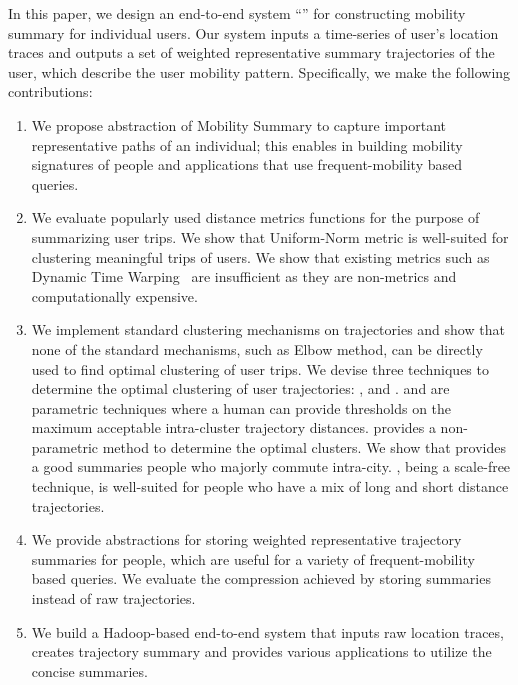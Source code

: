In this paper, we design an end-to-end system ``\trajSummary'' for constructing mobility summary for individual users. Our system inputs a time-series of user's location traces and outputs a set of weighted representative summary trajectories of the user, which describe the user mobility pattern. 
Specifically, we make the following contributions:
\begin{enumerate}[topsep=0pt,itemsep=-1ex,partopsep=1ex,parsep=1ex]
\item We propose abstraction of Mobility Summary to capture important representative paths of an individual; this enables in building mobility signatures of people and applications that use frequent-mobility based queries.
\item We evaluate popularly used distance metrics functions for the purpose of summarizing user trips. We show that Uniform-Norm metric is well-suited for clustering meaningful trips of users. We show that existing metrics such as Dynamic Time Warping~\cite{Yi1998} are insufficient as they are non-metrics and computationally expensive.
\item We implement standard clustering mechanisms on trajectories and show that none of the standard mechanisms, such as Elbow method, can be directly used to find optimal clustering of user trips. We devise three techniques to determine the optimal clustering of user trajectories: \thresh, \lthAware and \modal. \thresh and \lthAware are parametric techniques where a human can provide thresholds on the maximum acceptable intra-cluster trajectory distances. \modal provides a non-parametric method to determine the optimal clusters. We show that \thresh provides a good summaries people who majorly commute intra-city. \modal, being a scale-free technique, is well-suited for people who have a mix of long and short distance trajectories.
\item We provide abstractions for storing weighted representative trajectory summaries for people, which are useful for a variety of frequent-mobility based queries. We evaluate the compression achieved by storing summaries instead of raw trajectories.
\item We build a Hadoop-based end-to-end system that inputs raw location traces, creates trajectory summary and provides various applications to utilize the concise summaries. 
\end{enumerate}

